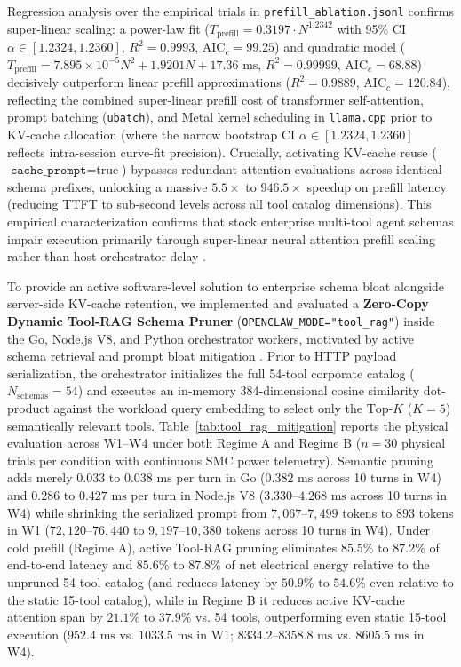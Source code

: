 \documentclass[11pt,a4paper]{article}
\begin{document}
Regression analysis over the empirical trials in \texttt{prefill\_ablation.jsonl} confirms super-linear scaling: a power-law fit ($T_{\text{prefill}} = 0.3197 \cdot N^{1.2342}$ with 95\% CI $\alpha \in [1.2324, 1.2360]$, $R^2 = 0.9993$, $\text{AIC}_c = 99.25$) and quadratic model ($T_{\text{prefill}} = 7.895 \times 10^{-5} N^2 + 1.9201 N + 17.36\text{ ms}$, $R^2 = 0.99999$, $\text{AIC}_c = 68.88$) decisively outperform linear prefill approximations ($R^2 = 0.9889$, $\text{AIC}_c = 120.84$), reflecting the combined super-linear prefill cost of transformer self-attention, prompt batching (\texttt{ubatch}), and Metal kernel scheduling in \texttt{llama.cpp} prior to KV-cache allocation (where the narrow bootstrap CI $\alpha \in [1.2324, 1.2360]$ reflects intra-session curve-fit precision). Crucially, activating KV-cache reuse ($\texttt{cache\_prompt} = \text{true}$) bypasses redundant attention evaluations across identical schema prefixes, unlocking a massive $5.5\times$ to $946.5\times$ speedup on prefill latency (reducing TTFT to sub-second levels across all tool catalog dimensions). This empirical characterization confirms that stock enterprise multi-tool agent schemas impair execution primarily through super-linear neural attention prefill scaling rather than host orchestrator delay \cite{kwon2023vllm}.

To provide an active software-level solution to enterprise schema bloat alongside server-side KV-cache retention, we implemented and evaluated a \textbf{Zero-Copy Dynamic Tool-RAG Schema Pruner} (\texttt{OPENCLAW\_MODE="tool\_rag"}) inside the Go, Node.js V8, and Python orchestrator workers, motivated by active schema retrieval and prompt bloat mitigation \cite{kwon2023vllm}. Prior to HTTP payload serialization, the orchestrator initializes the full 54-tool corporate catalog ($N_{\text{schemas}} = 54$) and executes an in-memory 384-dimensional cosine similarity dot-product against the workload query embedding to select only the $\text{Top-}K$ ($K=5$) semantically relevant tools. Table~\ref{tab:tool_rag_mitigation} reports the physical evaluation across W1--W4 under both Regime A and Regime B ($n=30$ physical trials per condition with continuous SMC power telemetry). Semantic pruning adds merely $0.033\text{ to }0.038\text{ ms}$ per turn in Go ($0.382\text{ ms}$ across 10 turns in W4) and $0.286\text{ to }0.427\text{ ms}$ per turn in Node.js V8 ($3.330\text{--}4.268\text{ ms}$ across 10 turns in W4) while shrinking the serialized prompt from $7{,}067\text{--}7{,}499$ tokens to $893$ tokens in W1 ($72{,}120\text{--}76{,}440$ to $9{,}197\text{--}10{,}380$ tokens across 10 turns in W4). Under cold prefill (Regime A), active Tool-RAG pruning eliminates $85.5\%\text{ to }87.2\%$ of end-to-end latency and $85.6\%\text{ to }87.8\%$ of net electrical energy relative to the unpruned 54-tool catalog (and reduces latency by $50.9\%\text{ to }54.6\%$ even relative to the static 15-tool catalog), while in Regime B it reduces active KV-cache attention span by $21.1\%\text{ to }37.9\%$ vs. 54 tools, outperforming even static 15-tool execution ($952.4\text{ ms}$ vs. $1033.5\text{ ms}$ in W1; $8334.2\text{--}8358.8\text{ ms}$ vs. $8605.5\text{ ms}$ in W4).
\end{document}
